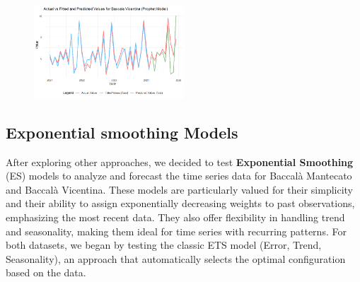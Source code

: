 \documentclass[10pt,twocolumn,letterpaper]{article}
\begin{document}
\begin{figure}[H]
    \centering
    \includegraphics[width=0.5\textwidth]{PlotsBEFD/PRED_PROPHET_VIC.png} 
    \caption{}
    \label{fig:PRED_PROPHET_VIC}
\end{figure}

\subsection{Exponential smoothing Models}
After exploring other approaches, we decided to test \textbf{Exponential Smoothing} (ES) models to analyze and forecast the time series data for Baccalà Mantecato and Baccalà Vicentina. These models are particularly valued for their simplicity and their ability to assign exponentially decreasing weights to past observations, emphasizing the most recent data. They also offer flexibility in handling trend and seasonality, making them ideal for time series with recurring patterns.
For both datasets, we began by testing the classic ETS model (Error, Trend, Seasonality), an approach that automatically selects the optimal configuration based on the data.
\end{document}
